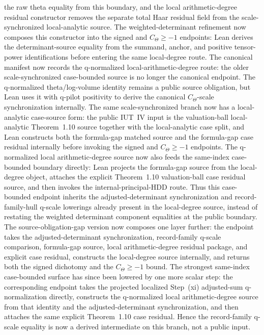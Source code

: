 \documentclass[11pt]{article}
\newcommand{\CTheta}{C_\Theta}
\theoremstyle{plain}
\theoremstyle{definition}
\theoremstyle{remark}
\begin{document}
the raw theta equality from this boundary, and the local arithmetic-degree
residual constructor removes the separate total Haar residual field from the
scale-synchronized local-analytic source.  The weighted-determinant refinement
now composes this constructor into the signed and \(\CTheta\ge -1\) endpoints:
Lean derives the determinant-source equality from the summand, anchor, and
positive tensor-power identifications before entering the same local-degree
route.  The canonical manifest now records the q-normalized
local-arithmetic-degree route: the older scale-synchronized case-bounded
source is no longer the canonical endpoint.  The q-normalized theta/log-volume
identity remains a public source obligation, but Lean uses it with q-pilot
positivity to derive the canonical \(C_\Theta\)-scale synchronization
internally.
The same scale-synchronized branch now has a local-analytic case-source form:
the public IUT~IV input is the valuation-ball local-analytic Theorem~1.10
source together with the local-analytic case split, and Lean constructs both
the formula-gap matched source and the formula-gap case residual internally
before invoking the signed and \(\CTheta\ge -1\) endpoints.
The q-normalized local arithmetic-degree source now also feeds the same-index
case-bounded boundary directly: Lean projects the formula-gap source from the
local-degree object, attaches the explicit Theorem~1.10 valuation-ball case
residual source, and then invokes the internal-principal-HDD route.  Thus this
case-bounded endpoint inherits the adjusted-determinant synchronization and
record-family-hull q-scale lowerings already present in the local-degree
source, instead of restating the weighted determinant component equalities at
the public boundary.
The source-obligation-gap version now composes one layer further: the endpoint
takes the adjusted-determinant synchronization, record-family q-scale
comparison, formula-gap source, local arithmetic-degree residual package, and
explicit case residual, constructs the local-degree source internally, and
returns both the signed dichotomy and the \(\CTheta\ge -1\) bound.
The strongest same-index case-bounded surface has since been lowered by one
more scalar step: the corresponding endpoint takes the projected localized
Step~(xi) adjusted-sum q-normalization directly, constructs the q-normalized
local arithmetic-degree source from that identity and the adjusted-determinant
synchronization, and then attaches the same explicit Theorem~1.10 case
residual.  Hence the record-family q-scale equality is now a derived
intermediate on this branch, not a public input.
\end{document}
